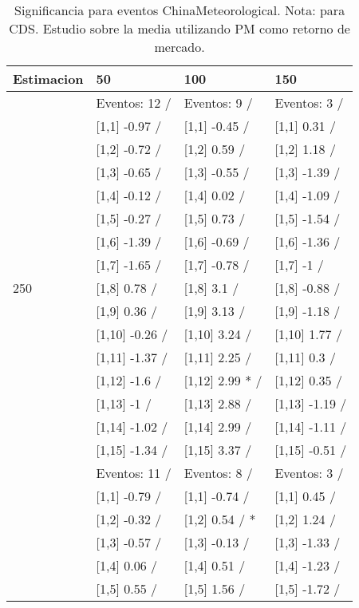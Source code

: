 \begin{table}

\caption{Significancia para eventos ChinaMeteorological. Nota: para CDS. Estudio sobre la media utilizando PM como retorno de mercado.}
\centering
\begin{tabular}[t]{llll}
\toprule
Estimacion & 50 & 100 & 150\\
\midrule
 & Eventos:  12 / & Eventos:  9 / & Eventos:  3 /\\
 & {}[1,1] -0.97  / & {}[1,1] -0.45  / & {}[1,1] 0.31  /\\
 & {}[1,2] -0.72  / & {}[1,2] 0.59  / & {}[1,2] 1.18  /\\
 & {}[1,3] -0.65  / & {}[1,3] -0.55  / & {}[1,3] -1.39  /\\
 & {}[1,4] -0.12  / & {}[1,4] 0.02  / & {}[1,4] -1.09  /\\
\addlinespace
 & {}[1,5] -0.27  / & {}[1,5] 0.73  / & {}[1,5] -1.54  /\\
 & {}[1,6] -1.39  / & {}[1,6] -0.69  / & {}[1,6] -1.36  /\\
 & {}[1,7] -1.65  / & {}[1,7] -0.78  / & {}[1,7] -1  /\\
250 & {}[1,8] 0.78  / & {}[1,8] 3.1  / & {}[1,8] -0.88  /\\
 & {}[1,9] 0.36  / & {}[1,9] 3.13  / & {}[1,9] -1.18  /\\
\addlinespace
 & {}[1,10] -0.26  / & {}[1,10] 3.24  / & {}[1,10] 1.77  /\\
 & {}[1,11] -1.37  / & {}[1,11] 2.25  / & {}[1,11] 0.3  /\\
 & {}[1,12] -1.6  / & {}[1,12] 2.99 * / & {}[1,12] 0.35  /\\
 & {}[1,13] -1  / & {}[1,13] 2.88  / & {}[1,13] -1.19  /\\
 & {}[1,14] -1.02  / & {}[1,14] 2.99  / & {}[1,14] -1.11  /\\
\addlinespace
 & {}[1,15] -1.34  / & {}[1,15] 3.37  / & {}[1,15] -0.51  /\\
 & Eventos:  11 / & Eventos:  8 / & Eventos:  3 /\\
 & {}[1,1] -0.79  / & {}[1,1] -0.74  / & {}[1,1] 0.45  /\\
 & {}[1,2] -0.32  / & {}[1,2] 0.54  / * & {}[1,2] 1.24  /\\
 & {}[1,3] -0.57  / & {}[1,3] -0.13  / & {}[1,3] -1.33  /\\
\addlinespace
 & {}[1,4] 0.06  / & {}[1,4] 0.51  / & {}[1,4] -1.23  /\\
 & {}[1,5] 0.55  / & {}[1,5] 1.56  / & {}[1,5] -1.72  /\\

\end{tabular}
\end{table}
